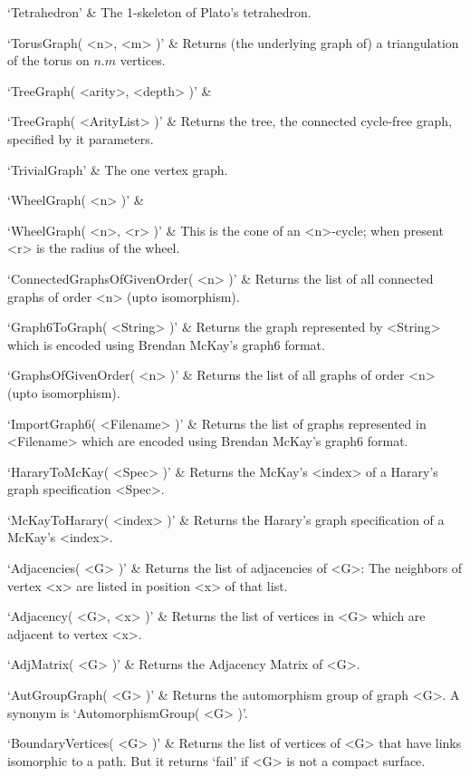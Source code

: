 `Tetrahedron' & 
The 1-skeleton of Plato's tetrahedron.

`TorusGraph( <n>, <m> )' &
Returns (the underlying graph of) a triangulation of the torus on $n.m$ vertices.

`TreeGraph( <arity>, <depth> )' &

`TreeGraph( <ArityList> )' &
Returns the tree, the connected cycle-free graph, specified by it parameters.

`TrivialGraph' & 
The one vertex graph.

`WheelGraph( <n> )' & 

`WheelGraph( <n>, <r> )' & 
This  is  the   cone  of  an  <n>-cycle; when present <r> is the radius of the wheel.
\enditems



\beginitems
`ConnectedGraphsOfGivenOrder( <n> )' &
Returns the list of all connected graphs of order <n> (upto isomorphism).

`Graph6ToGraph( <String> )' &
Returns the graph represented by <String> which is encoded using Brendan McKay's graph6 format. 

`GraphsOfGivenOrder( <n> )' &
Returns the list of all graphs of order <n> (upto isomorphism). 

`ImportGraph6( <Filename> )' &
Returns the list of graphs represented in <Filename> which are encoded using Brendan McKay's graph6 format.

`HararyToMcKay( <Spec> )' &
Returns the McKay's <index> of a Harary's graph specification <Spec>.

`McKayToHarary( <index> )' &
Returns the Harary's graph specification of a McKay's <index>.

\enditems



\beginitems
`Adjacencies( <G> )' & 
Returns the list of adjacencies of <G>: The neighbors of vertex <x> are listed in position <x> of that list.

`Adjacency( <G>, <x> )' & 
Returns the list of vertices in <G> which are adjacent to vertex <x>.

`AdjMatrix( <G> )' & 
Returns the Adjacency Matrix of <G>.

`AutGroupGraph( <G> )' & 
Returns the automorphism group of graph <G>. A synonym is `AutomorphismGroup( <G> )'.

`BoundaryVertices( <G> )' &
Returns the list of vertices of <G> that have links isomorphic to a path. 
But it returns `fail' if <G> is not a compact surface.

